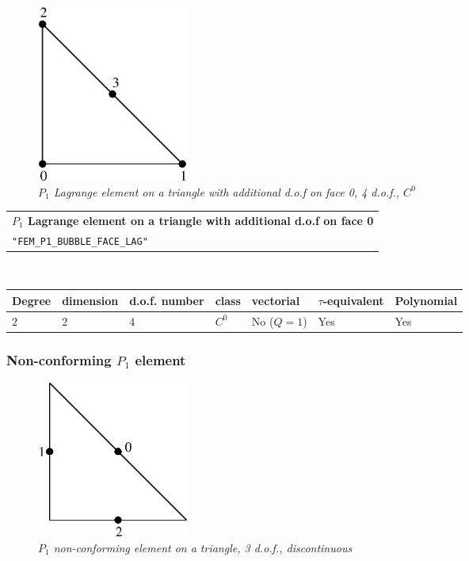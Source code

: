 \documentclass[10pt,a4paper]{article}
\begin{document}
\begin{figure}[H]
  \begin{center}
    \includegraphics[width=5cm,angle=0]{getfemlist_triangle_P1_with_P2_face.eps}
  \end{center}
  \caption{ \it $P_1$ Lagrange element on a triangle with additional d.o.f on face 0, 4 d.o.f., $C^0$} 
  \label{fig:triangle_p1_p2_face}
\end{figure}

\begin{center}
\begin{tabular}{|m{16.11cm}|} \hline 
{ \bf $P_1$ Lagrange element on a triangle with additional d.o.f on face 0}\\
{\tt "FEM\_P1\_BUBBLE\_FACE\_LAG"} 
\end{tabular} \\ \vspace{-1pt} 
\begin{tabular}{|m{2cm}|m{2cm}|m{2.5cm}|m{1.2cm}|m{2cm}|m{2cm}|m{1.8cm}|} \hline 
Degree & dimension & d.o.f. number & class & vectorial & \mbox{$\tau$-equivalent} & Polynomial\\ \hline
$2$ & $2$ & $4$ & $C^0$ & No \mbox{($Q = 1$)} & Yes & Yes\\ \hline
\end{tabular}
\end{center}

\subsubsection{Non-conforming $P_1$ element}


\begin{figure}[H]
  \begin{center}
    \includegraphics[width=5cm,angle=0]{getfemlist_triangle_P1_non_conforming.eps}
  \end{center}
  \caption{ \it $P_1$ non-conforming element on a triangle, 3 d.o.f., discontinuous} 
  \label{fig:triangle_non_conforming}
\end{figure}
\end{document}
